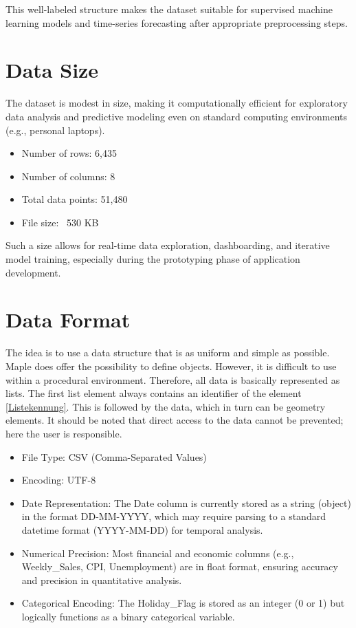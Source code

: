 This well-labeled structure makes the dataset suitable for supervised machine learning models and time-series forecasting after appropriate preprocessing steps.

\section{Data Size}

The dataset is modest in size, making it computationally efficient for exploratory data analysis and predictive modeling even on standard computing environments (e.g., personal laptops).

\begin{itemize}
    \item Number of rows: 6,435
    \item Number of columns: 8
    \item Total data points: 51,480
    \item File size: ~530 KB
\end{itemize}

Such a size allows for real-time data exploration, dashboarding, and iterative model training, especially during the prototyping phase of application development.

\section{Data Format}

The idea is to use a data structure that is as uniform and simple as possible. Maple does offer the possibility to define objects. However, it is difficult to use within a procedural environment. Therefore, all data is basically represented as lists. The first list element always contains an identifier of the element \ref{Listekennung}. This is followed by the data, which in turn can be geometry elements. It should be noted that direct access to the data cannot be prevented; here the user is responsible.

\begin{itemize}
	\item File Type: CSV (Comma-Separated Values)
	\item Encoding: UTF-8
	\item Date Representation: The Date column is currently stored as a string (object) in the format DD-MM-YYYY, which may require parsing to a standard datetime format (YYYY-MM-DD) for temporal analysis.
	\item Numerical Precision: Most financial and economic columns (e.g., Weekly\_Sales, CPI, Unemployment) are in float format, ensuring accuracy and precision in quantitative analysis.
	\item Categorical Encoding: The Holiday\_Flag is stored as an integer (0 or 1) but logically functions as a binary categorical variable.
\end{itemize}

